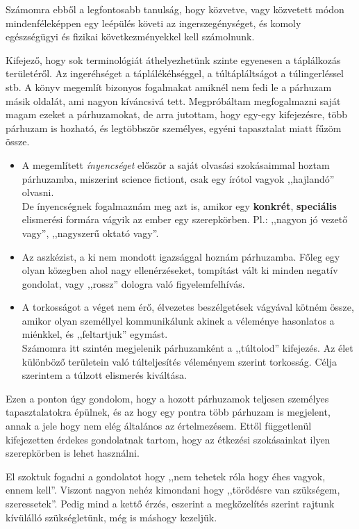 \documentclass[a4paper,12pt]{article}
\begin{document}
	Számomra ebből a legfontosabb tanulság, hogy közvetve, vagy közvetett módon mindenféleképpen egy leépülés követi az ingerszegénységet, és komoly egészségügyi és fizikai következményekkel kell számolnunk.
	
	Kifejező, hogy sok terminológiát áthelyezhetünk szinte egyenesen a táplálkozás területéről. Az ingeréhséget a táplálékéhséggel, a túltápláltságot a túlingerléssel stb. A könyv megemlít bizonyos fogalmakat amiknél nem fedi le a párhuzam másik oldalát, ami nagyon kíváncsivá tett.
	Megpróbáltam  megfogalmazni saját magam ezeket a párhuzamokat, de arra jutottam, hogy egy-egy kifejezésre, több párhuzam is hozható, és legtöbbször személyes, egyéni tapasztalat miatt fűzöm össze. 
	\begin{itemize}
		\item A megemlített \textit{ínyencséget} először a saját olvasási szokásaimmal hoztam párhuzamba, miszerint science fictiont, csak egy írótol vagyok ,,hajlandó'' olvasni. \\
		De ínyencségnek fogalmaznám meg azt is, amikor egy \textbf{konkrét}, \textbf{speciális} elismerési formára vágyik az ember egy szerepkörben. Pl.: ,,nagyon jó vezető vagy'', ,,nagyszerű oktató vagy''.
		\item Az aszkézist, a ki nem mondott igazsággal hoznám párhuzamba. Főleg egy olyan közegben ahol nagy ellenérzéseket, tompítást vált ki minden negatív gondolat, vagy ,,rossz'' dologra való figyelemfelhívás.
		\item A torkosságot a véget nem érő, élvezetes beszélgetések vágyával kötném össze, amikor olyan személlyel kommunikálunk akinek a véleménye hasonlatos a miénkkel, és ,,feltartjuk'' egymást. \\
		Számomra itt szintén megjelenik párhuzamként a ,,túltolod'' kifejezés. Az élet különböző területein való túlteljesítés véleményem szerint torkosság. Célja szerintem a túlzott elismerés kiváltása.
	\end{itemize}
	Ezen a ponton úgy gondolom, hogy a hozott párhuzamok teljesen személyes tapasztalatokra épülnek, és az hogy egy pontra több párhuzam is megjelent, annak a jele hogy nem elég általános az értelmezésem. Ettől függetlenül kifejezetten érdekes gondolatnak tartom, hogy az étkezési szokásainkat ilyen szerepkörben is lehet használni.
	
	El szoktuk fogadni a gondolatot hogy ,,nem tehetek róla hogy éhes vagyok, ennem kell''. Viszont nagyon nehéz kimondani hogy ,,törődésre van szükségem, szeressetek''. Pedig mind a kettő érzés, eszerint a megközelítés szerint rajtunk kívülálló szükségletünk, még is máshogy kezeljük.
	
\end{document}
